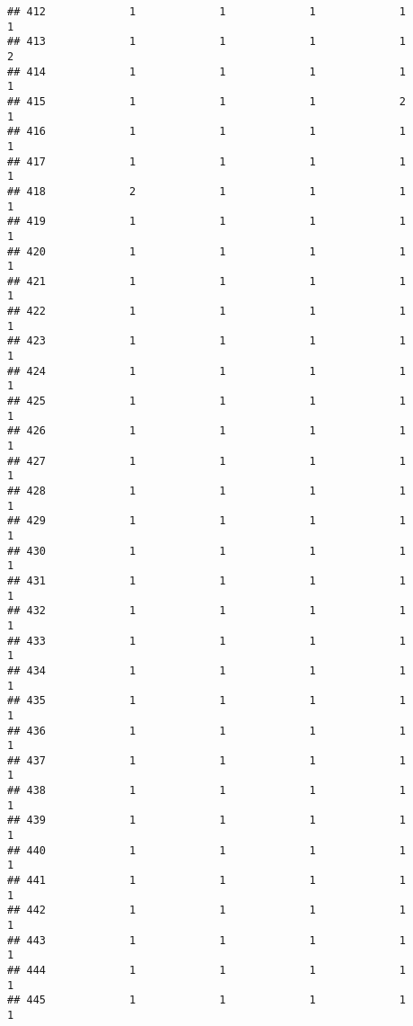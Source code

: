 \documentclass[
]{article}
\begin{document}
\begin{verbatim}
## 412             1             1             1             1             1
## 413             1             1             1             1             2
## 414             1             1             1             1             1
## 415             1             1             1             2             1
## 416             1             1             1             1             1
## 417             1             1             1             1             1
## 418             2             1             1             1             1
## 419             1             1             1             1             1
## 420             1             1             1             1             1
## 421             1             1             1             1             1
## 422             1             1             1             1             1
## 423             1             1             1             1             1
## 424             1             1             1             1             1
## 425             1             1             1             1             1
## 426             1             1             1             1             1
## 427             1             1             1             1             1
## 428             1             1             1             1             1
## 429             1             1             1             1             1
## 430             1             1             1             1             1
## 431             1             1             1             1             1
## 432             1             1             1             1             1
## 433             1             1             1             1             1
## 434             1             1             1             1             1
## 435             1             1             1             1             1
## 436             1             1             1             1             1
## 437             1             1             1             1             1
## 438             1             1             1             1             1
## 439             1             1             1             1             1
## 440             1             1             1             1             1
## 441             1             1             1             1             1
## 442             1             1             1             1             1
## 443             1             1             1             1             1
## 444             1             1             1             1             1
## 445             1             1             1             1             1

\end{verbatim}
\end{document}
